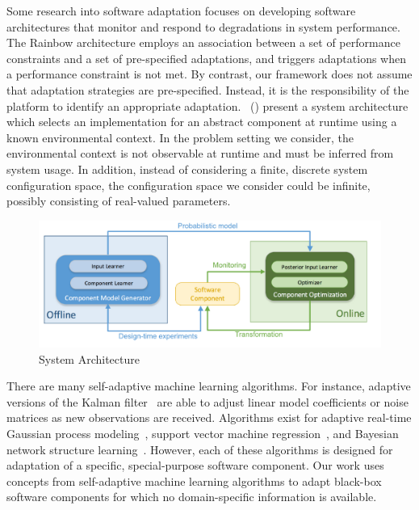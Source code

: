 \documentclass[letterpaper]{article}
\begin{document}
Some research into software adaptation focuses on developing software architectures that monitor and respond to degradations in system performance.
The Rainbow architecture \cite{garlan2004rainbow} employs an association between a set of performance constraints and a set of pre-specified adaptations, and triggers adaptations when a performance constraint is not met.
By contrast, our framework does not assume that adaptation strategies are pre-specified. Instead, it is the responsibility of the platform to identify an appropriate adaptation.
\citeauthor{morin2009models}~(\citeyear{morin2009models}) present a system architecture which selects an implementation for an 
abstract component at runtime using a known environmental context.
In the problem setting we consider, the environmental context is not observable at runtime and must be inferred from system usage.
In addition, instead of considering a finite, discrete system configuration space, the configuration space we consider could be infinite, 
possibly consisting of real-valued parameters.

\begin{figure}[h!]
\centering
\includegraphics[width=\linewidth]{figures/architecture-overview.pdf}
\caption{System Architecture}
\label{fig:architecture-overview}
\end{figure}

There are many self-adaptive machine learning algorithms.
For instance, adaptive versions of the Kalman filter~\cite{rutan1991adaptive,oussalah2001adaptive,wang2010adaptive} 
are able to adjust linear model coefficients or noise matrices as new observations are received.
Algorithms exist for adaptive real-time Gaussian process modeling~\cite{nguyen2009local}, support vector machine regression~\cite{cao2003support}, and Bayesian network structure learning~\cite{castillo2009adaptive}.
However, each of these algorithms is designed for adaptation of a specific, special-purpose software component.
Our work uses concepts from self-adaptive machine learning algorithms to adapt black-box software components for which no domain-specific information is available.
\end{document}
